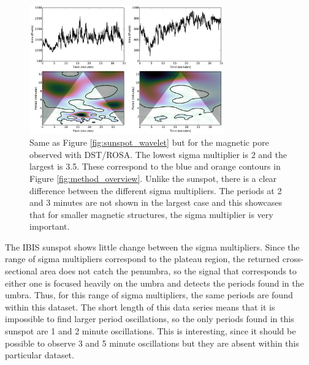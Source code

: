     \begin{figure}
        \centering
        \includegraphics[width=0.75\textwidth]{pore_wavelet.pdf}
        \caption{
            Same as Figure \ref{fig:sunspot_wavelet} but for the magnetic pore observed with DST/ROSA.
            The lowest sigma multiplier is 2 and the largest is 3.5. 
            These correspond to the blue and orange contours in Figure \ref{fig:method_overview}.
            Unlike the sunspot, there is a clear difference between the different sigma multipliers.
            The periods at 2 and 3 minutes are not shown in the largest case and this showcases that for smaller magnetic structures, the sigma multiplier is very important. 
        }
        \label{fig:pore_wavelet}
    \end{figure}
    
    The IBIS sunspot shows little change between the sigma multipliers.
    Since the range of sigma multipliers correspond to the plateau region, the returned cross-sectional area does not catch the penumbra, so the signal that corresponds to either one is focused heavily on the umbra and detects the periods found in the umbra.
    Thus, for this range of sigma multipliers, the same periods are found within this dataset.
    The short length of this data series means that it is impossible to find larger period oscillations, so the only periods found in this sunspot are 1 and 2 minute oscillations.
    This is interesting, since it should be possible to observe 3 and 5 minute oscillations but they are absent within this particular dataset.
       
